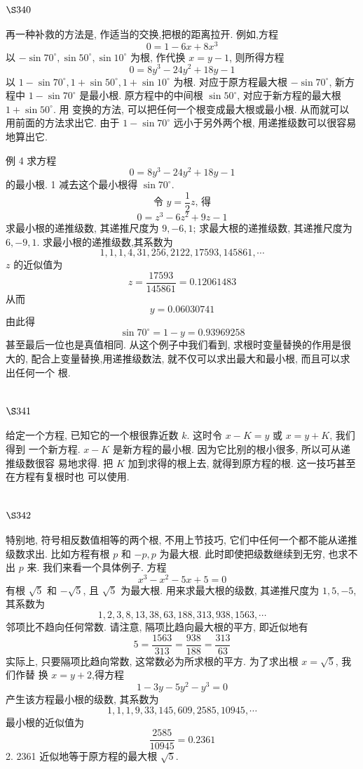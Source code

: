 \section{$\S 340$}

再一种补救的方法是, 作适当的交换,把根的距离拉开. 例如,方程
\[
0=1-6 x+8 x^{3}
\]
以 $-\sin 70^{\circ}, \sin 50^{\circ}, \sin 10^{\circ}$ 为根, 作代换 $x=y-1$, 则所得方程
\[
0=8 y^{3}-24 y^{2}+18 y-1
\]
以 $1-\sin 70^{\circ}, 1+\sin 50^{\circ}, 1+\sin 10^{\circ}$ 为根. 对应于原方程最大根 $-\sin 70^{\circ}$, 新方程中 $1-\sin 70^{\circ}$ 是最小根. 原方程中的中间根 $\sin 50^{\circ}$, 对应于新方程的最大根 $1+\sin 50^{\circ}$. 用 变换的方法, 可以把任何一个根变成最大根或最小根. 从而就可以用前面的方法求出它. 由于 $1-\sin 70^{\circ}$ 远小于另外两个根, 用递推级数可以很容易地算出它.

例 4 求方程
\[
0=8 y^{3}-24 y^{2}+18 y-1
\]
的最小根. 1 减去这个最小根得 $\sin 70^{\circ}$.
\[
\text { 令 } y=\frac{1}{2} z \text {, 得 }
\]
\[
0=z^{3}-6 z^{2}+9 z-1
\]
求最小根的递推级数, 其递推尺度为 $9,-6,1$; 求最大根的递推级数, 其递推尺度为 $6,-9,1$. 求最小根的递推级数,其系数为
\[
1,1,1,4,31,256,2122,17593,145861, \cdots
\]
$z$ 的近似值为
\[
z=\frac{17593}{145861}=0.12061483
\]
从而
\[
y=0.06030741
\]
由此得
\[
\sin 70^{\circ}=1-y=0.93969258
\]
甚至最后一位也是真值相同. 从这个例子中我们看到, 求根时变量替换的作用是很大的, 配合上变量替换,用递推级数法, 就不仅可以求出最大和最小根, 而且可以求出任何一个 根.

\section{$\S 341$}

给定一个方程, 已知它的一个根很靠近数 $k$. 这时令 $x-K=y$ 或 $x=y+K$, 我们得到 一个新方程. $x-K$ 是新方程的最小根. 因为它比别的根小很多, 所以可从递推级数很容 易地求得. 把 $K$ 加到求得的根上去, 就得到原方程的根. 这一技巧甚至在方程有复根时也 可以使用.

\section{$\S 342$}

特别地, 符号相反数值相等的两个根, 不用上节技巧, 它们中任何一个都不能从递推 级数求出. 比如方程有根 $p$ 和 $-p, p$ 为最大根. 此时即使把级数继续到无穷, 也求不出 $p$ 来. 我们来看一个具体例子. 方程
\[
x^{3}-x^{2}-5 x+5=0
\]
有根 $\sqrt{5}$ 和 $-\sqrt{5}$, 且 $\sqrt{5}$ 为最大根. 用来求最大根的级数, 其递推尺度为 $1,5,-5$, 其系数为
\[
1,2,3,8,13,38,63,188,313,938,1563, \cdots
\]
邻项比不趋向任何常数. 请注意, 隔项比趋向最大根的平方, 即近似地有
\[
5=\frac{1563}{313}=\frac{938}{188}=\frac{313}{63}
\]
实际上, 只要隔项比趋向常数, 这常数必为所求根的平方. 为了求出根 $x=\sqrt{5}$, 我们作替 换 $x=y+2$,得方程
\[
1-3 y-5 y^{2}-y^{3}=0
\]
产生该方程最小根的级数, 其系数为
\[
1,1,1,9,33,145,609,2585,10945, \cdots
\]
最小根的近似值为
\[
\frac{2585}{10945}=0.2361
\]
2. 2361 近似地等于原方程的最大根 $\sqrt{5}$.


